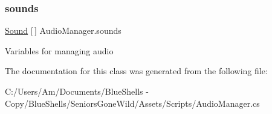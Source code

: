 \subsubsection{\texorpdfstring{sounds}{sounds}}
{\footnotesize\ttfamily \mbox{\hyperlink{class_sound}{Sound}} \mbox{[}$\,$\mbox{]} Audio\+Manager.\+sounds}



Variables for managing audio 



The documentation for this class was generated from the following file\+:\begin{DoxyCompactItemize}
\item 
C\+:/\+Users/\+Am/\+Documents/\+Blue\+Shells -\/ Copy/\+Blue\+Shells/\+Seniors\+Gone\+Wild/\+Assets/\+Scripts/Audio\+Manager.\+cs\end{DoxyCompactItemize}
